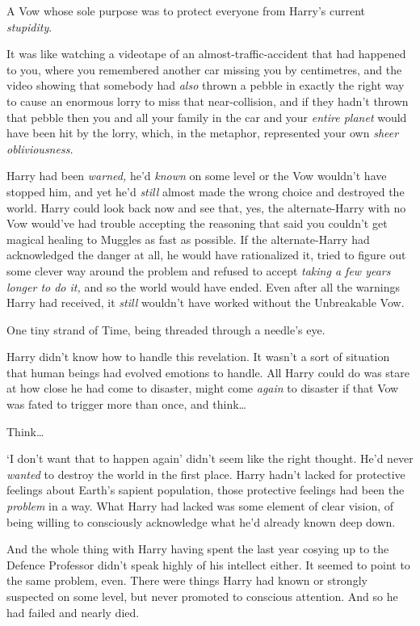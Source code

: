 A Vow whose sole purpose was to protect everyone from Harry’s current \emph{stupidity}.

It was like watching a videotape of an almost-traffic-accident that had happened to you, where you remembered another car missing you by centimetres, and the video showing that somebody had \emph{also} thrown a pebble in exactly the right way to cause an enormous lorry to miss that near-collision, and if they hadn’t thrown that pebble then you and all your family in the car and your \emph{entire planet} would have been hit by the lorry, which, in the metaphor, represented your own \emph{sheer obliviousness.}

Harry had been \emph{warned,} he’d \emph{known} on some level or the Vow wouldn’t have stopped him, and yet he’d \emph{still} almost made the wrong choice and destroyed the world. Harry could look back now and see that, yes, the alternate-Harry with no Vow would’ve had trouble accepting the reasoning that said you couldn’t get magical healing to Muggles as fast as possible. If the alternate-Harry had acknowledged the danger at all, he would have rationalized it, tried to figure out some clever way around the problem and refused to accept \emph{taking a few years longer to do it,} and so the world would have ended. Even after all the warnings Harry had received, it \emph{still} wouldn’t have worked without the Unbreakable Vow.

One tiny strand of Time, being threaded through a needle’s eye.

Harry didn’t know how to handle this revelation. It wasn’t a sort of situation that human beings had evolved emotions to handle. All Harry could do was stare at how close he had come to disaster, might come \emph{again} to disaster if that Vow was fated to trigger more than once, and think…

Think…

‘I don’t want that to happen again’ didn’t seem like the right thought. He’d never \emph{wanted} to destroy the world in the first place. Harry hadn’t lacked for protective feelings about Earth’s sapient population, those protective feelings had been the \emph{problem} in a way. What Harry had lacked was some element of clear vision, of being willing to consciously acknowledge what he’d already known deep down.

And the whole thing with Harry having spent the last year cosying up to the Defence Professor didn’t speak highly of his intellect either. It seemed to point to the same problem, even. There were things Harry had known or strongly suspected on some level, but never promoted to conscious attention. And so he had failed and nearly died.

